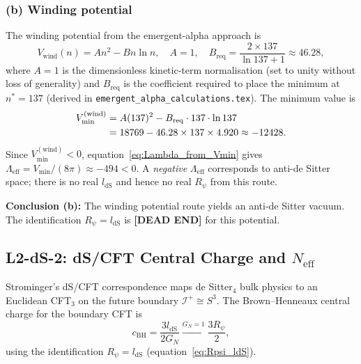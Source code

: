 \documentclass[11pt,a4paper]{article}
\theoremstyle{definition}
\theoremstyle{remark}
\begin{document}
\subsubsection*{(b) Winding potential}

The winding potential from the emergent-alpha approach is
\begin{equation}
  V_{\mathrm{wind}}(n) = A n^2 - B n \ln n,
  \quad A = 1,\quad B_{\mathrm{req}} = \frac{2\times 137}{\ln 137 + 1} \approx 46.28,
  \label{eq:V_winding}
\end{equation}
where $A=1$ is the dimensionless kinetic-term normalisation (set to unity
without loss of generality) and $B_{\mathrm{req}}$ is the coefficient required
to place the minimum at $n^*=137$ (derived in \texttt{emergent\_alpha\_calculations.tex}).
The minimum value is
\begin{align}
  V_{\min}^{(\mathrm{wind})}
  &= A(137)^2 - B_{\mathrm{req}}\cdot 137\cdot\ln 137 \notag\\
  &= 18769 - 46.28 \times 137 \times 4.920
  \approx -12428.
  \label{eq:Vmin_winding}
\end{align}
Since $V_{\min}^{(\mathrm{wind})} < 0$, equation~\eqref{eq:Lambda_from_Vmin}
gives $\Lambda_{\mathrm{eff}} = V_{\min}/(8\pi) \approx -494 < 0$.
A \emph{negative} $\Lambda_{\mathrm{eff}}$ corresponds to anti-de Sitter space;
there is no real $l_{\mathrm{dS}}$ and hence no real $R_\psi$ from this route.

\textbf{Conclusion (b):} The winding potential route yields an
anti-de Sitter vacuum.  The identification $R_\psi = l_{\mathrm{dS}}$ is
\textbf{[DEAD END]} for this potential.

\subsection{L2-dS-2: dS/CFT Central Charge and $N_{\mathrm{eff}}$}
\label{subsec:L2dS2}

Strominger's dS/CFT correspondence maps de Sitter$_4$ bulk physics to an
Euclidean CFT$_3$ on the future boundary $\mathcal{I}^+ \cong S^3$.
The Brown--Henneaux central charge for the boundary CFT is
\begin{equation}
  c_{\mathrm{BH}} = \frac{3 l_{\mathrm{dS}}}{2 G_N}
  \xrightarrow{G_N=1} \frac{3 R_\psi}{2},
  \label{eq:c_BH}
\end{equation}
using the identification $R_\psi = l_{\mathrm{dS}}$
(equation~\eqref{eq:Rpsi_ldS}).
\end{document}
